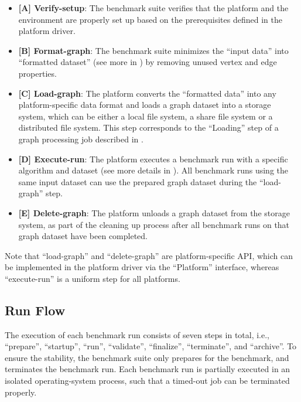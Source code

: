 \begin{itemize}
    \item \textbf{[A] Verify-setup}: The benchmark suite verifies that the platform and the environment are properly set up based on the prerequisites defined in the platform driver.
    
    \item \textbf{[B] Format-graph}: The benchmark suite minimizes the ``input data'' into ``formatted dataset'' (see more in ) by removing unused vertex and edge properties.
    
    \item \textbf{[C] Load-graph}: The platform converts the ``formatted data'' into any platform-specific data format and loads a graph dataset into a storage system, which can be either a local file system, a share file system or a distributed file system. This step corresponds to the ``Loading'' step of a graph processing job described in .
    
    \item \textbf{[D] Execute-run}: The platform executes a benchmark run with a specific algorithm and dataset (see more details in ). All benchmark runs using the same input dataset can use the prepared graph dataset during the ``load-graph'' step. 
    
    \item \textbf{[E] Delete-graph}: The platform unloads a graph dataset from the storage system, as part of the cleaning up process after all benchmark runs on that graph dataset have been completed.
\end{itemize}

Note that ``load-graph'' and ``delete-graph'' are platform-specific API, which can be implemented in the platform driver via the ``Platform'' interface, whereas  ``execute-run'' is a uniform step for all platforms. 

\subsection{Run Flow}
\label{sec:process:execution:run_flow}
The execution of each benchmark run consists of seven steps in total, i.e., ``prepare'', ``startup'', ``run'', ``validate'', ``finalize'', ``terminate'', and  ``archive''. To ensure the stability, the benchmark suite only prepares for the benchmark, and terminates the benchmark run. Each benchmark run is partially executed in an isolated operating-system process, such that a timed-out job can be terminated properly.

